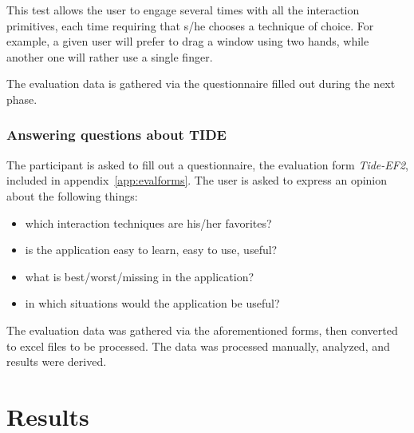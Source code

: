 This test allows the user to engage several times with all the interaction primitives, each time requiring that s/he chooses a technique of choice.
For example, a given user will prefer to drag a window using two hands, while another one will rather use a single finger.

The evaluation data is gathered via the questionnaire filled out during the next phase.

\subsubsection{Answering questions about TIDE}

The participant is asked to fill out a questionnaire, the evaluation form \emph{Tide-EF2}, included in appendix~\ref{app:evalforms}.
The user is asked to express an opinion about the following things:
\begin{itemize}
\item which interaction techniques are his/her favorites?
\item is the application easy to learn, easy to use, useful?
\item what is best/worst/missing in the application?
\item in which situations would the application be useful? 
\end{itemize}


The evaluation data was gathered via the aforementioned forms, then converted to excel files to be processed.
The data was processed manually, analyzed, and results were derived.

\clearpage
\section{Results}
\label{sec:results}

